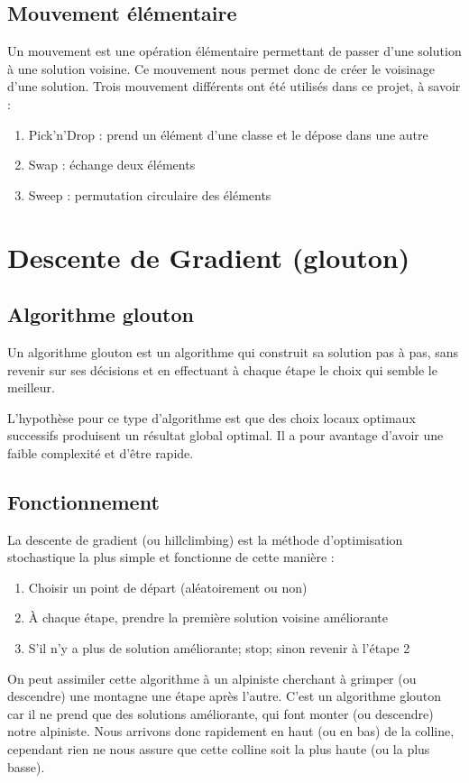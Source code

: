 \documentclass[a4paper]{article}
\begin{document}
	\subsection{Mouvement élémentaire}
	Un mouvement est une opération élémentaire permettant de passer d’une solution à une
solution voisine. Ce mouvement nous permet donc de créer le voisinage d'une solution. Trois mouvement différents ont été utilisés dans ce projet, à savoir :
\begin{enumerate}
\item{Pick'n'Drop : prend un élément d'une classe et le dépose dans une autre}
\item{Swap : échange deux éléments}
\item{Sweep : permutation circulaire des éléments}
\end{enumerate}

\section{Descente de Gradient (glouton)}
	\subsection{Algorithme glouton}
	Un algorithme glouton est un algorithme qui construit sa solution pas à pas, sans revenir sur ses décisions et en effectuant à chaque étape le choix qui semble le meilleur.

	L'hypothèse pour ce type d'algorithme est que des choix locaux optimaux successifs produisent un résultat global optimal. Il a pour avantage d'avoir une faible complexité et d'être rapide.

	\subsection{Fonctionnement}
	La descente de gradient (ou hillclimbing) est la méthode d'optimisation stochastique la plus simple et fonctionne de cette manière :
	\begin{enumerate}
		\item{Choisir un point de départ (aléatoirement ou non)}
		\item{À chaque étape, prendre la première solution voisine améliorante}
		\item{S'il n'y a plus de solution améliorante; stop; sinon revenir à l'étape 2}
	\end{enumerate}

	On peut assimiler cette algorithme à un alpiniste cherchant à grimper (ou descendre) une montagne une étape après l'autre. C'est un algorithme glouton car il ne prend que des solutions améliorante, qui font monter (ou descendre) notre alpiniste. Nous arrivons donc rapidement en haut (ou en bas) de la colline, cependant rien ne nous assure que cette colline soit la plus haute (ou la plus basse).
\end{document}
